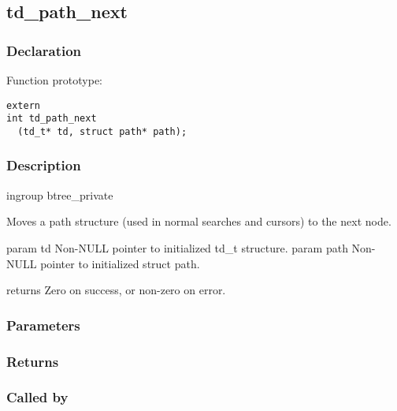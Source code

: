 
\newpage
\subsection{td\_path\_next}
\subsubsection{Declaration} Function prototype:

\begin{verbatim}
extern
int td_path_next
  (td_t* td, struct path* path);
\end{verbatim}

\subsubsection{Description}


 ingroup btree\_private

 Moves a path structure (used in normal searches and cursors)
 to the next node.

 param td Non-NULL pointer to initialized td\_t structure.
 param path Non-NULL pointer to initialized struct path.

 returns Zero on success, or non-zero on error.
 

\subsubsection{Parameters}
\subsubsection{Returns}
\subsubsection{Called by}
